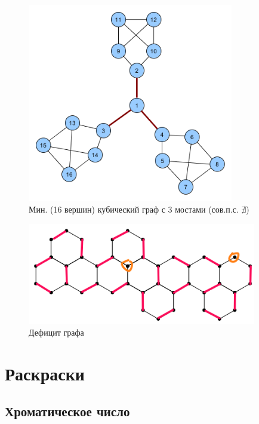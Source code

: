 \documentclass[a4paper,12pt]{article}
\numberwithin{figure}{section}
\theoremstyle{remark}
\begin{document}
\begin{figure}[H]
	\centering
	\includegraphics[width=9cm]{minimum-cubic-graph-with3-bridges.png}
	\caption{Мин. (16 вершин) кубический граф с 3 мостами (сов.п.с. $\nexists$)}
\end{figure}

\begin{figure}[H]
	\centering
	\includegraphics[width=10cm]{matching-deficit-2.png}
	\caption{Дефицит графа}
\end{figure}




\section{Раскраски}


\subsection{Хроматическое число}
\end{document}

